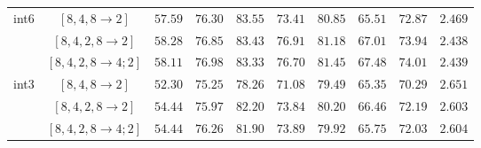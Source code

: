 \begin{table*}[t!]
{\begin{tabular}{@{}cccccccccc@{}}
                       \multirow{3}{*}{int6} & $[8,4,8 \rightarrow2] $       & $57.59$ & $76.30$ & $83.55$ & $73.41$ & $80.85$ & $65.51$ & $72.87$ & $2.469$              \\
                       & $[8,4,2,8 \rightarrow2] $    & $58.28$ & $76.85$ & $83.43$ & $76.91$ & $81.18$ & $67.01$ & $73.94$ & $2.438$             \\
                       & $[8,4,2,8 \rightarrow4;2] $ & $58.11$ & $76.98$ & $83.33$ & $76.70$ & $81.45$ & $67.48$ & $74.01$ & $2.439$             \\ 
 \midrule
 \multirow{3}{*}{int3} & $[8,4,8 \rightarrow2] $       & $52.30$ & $75.25$ & $78.26$ & $71.08$ & $79.49$ & $65.35$ & $70.29$ & $2.651$              \\
                       & $[8,4,2,8 \rightarrow2] $    & $54.44$ & $75.97$ & $82.20$ & $73.84$ & $80.20$ & $66.46$ & $72.19$ & $2.603$             \\
                       & $[8,4,2,8 \rightarrow4;2] $ & $54.44$ & $76.26$ & $81.90$ & $73.89$ & $79.92$ & $65.75$ & $72.03$ & $2.604$             \\
\bottomrule
\end{tabular}
}
\end{table*}

